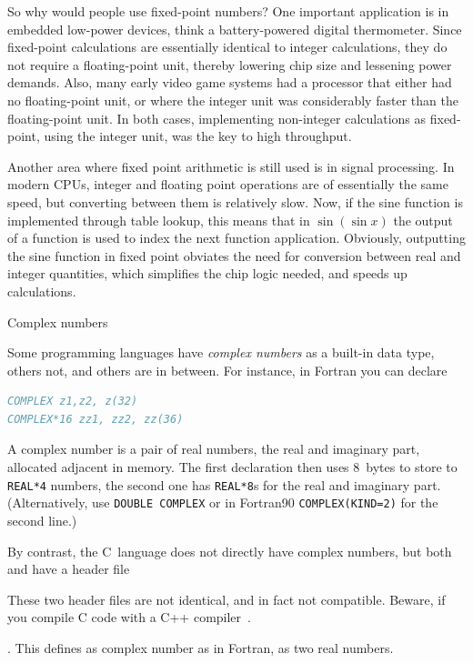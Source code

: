So why would people use fixed-point numbers? One important application
is in embedded low-power devices, think a battery-powered digital
thermometer. Since fixed-point calculations are essentially identical
to integer calculations, they do not require a floating-point unit,
thereby lowering chip size and lessening power demands. Also, many
early video game systems had a processor that either had no
floating-point unit, or where the integer unit was considerably faster
than the floating-point unit. In both cases, implementing non-integer
calculations as fixed-point, using the integer unit, was the key to
high throughput. 

Another area where fixed point arithmetic is still used is in signal
processing. In modern CPUs, integer and floating point operations
are of essentially the same speed, but converting between them is
relatively slow. Now, if the sine function is implemented through
table lookup, this means that in $\sin(\sin x)$ 
the output of a function is used to index the next function
application. Obviously, outputting the sine function in fixed point
obviates the need for conversion between real and integer quantities,
which simplifies the chip logic needed, and speeds up calculations.

 {Complex numbers}
\label{sec:complex}

Some programming languages have \emph{complex numbers} as a built-in data type,
others not, and others are in between. For instance, in Fortran you
can declare
\begin{lstlisting}[language=Fortran]
COMPLEX z1,z2, z(32)
COMPLEX*16 zz1, zz2, zz(36)
\end{lstlisting}
A complex number is a pair of real numbers, the real and imaginary
part, allocated adjacent in memory. The first declaration then uses
8~bytes to store to \lstinline{REAL*4} numbers, the second one has \lstinline{REAL*8}s
for the real and imaginary part.  (Alternatively,
use \lstinline{DOUBLE COMPLEX} or
in Fortran90 \lstinline{COMPLEX(KIND=2)} for the second line.)

By contrast, the C~language does not directly have complex
numbers, but both  and  have a  header
file
\begin{footnoteenv}
  {These two header files are not identical, and in fact
  not compatible. Beware, if you compile C code with a C++
  compiler~\cite{DobbsComplex}.}
\end{footnoteenv}
. This defines as complex number as in
Fortran, as two real numbers.

